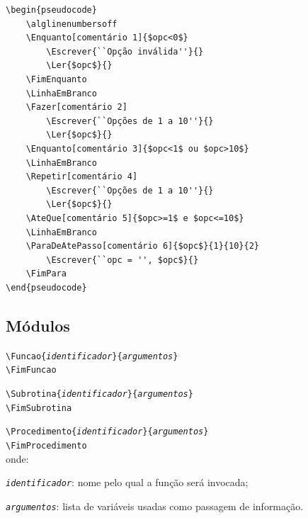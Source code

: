 \documentclass[a4paper,12pt,oneside,onecolumn,final,fleqn]{repUERJ}
\begin{document}
\begin{verbatim}
\begin{pseudocode}
    \alglinenumbersoff
    \Enquanto[comentário 1]{$opc<0$}
        \Escrever{``Opção inválida''}{}
        \Ler{$opc$}{}
    \FimEnquanto
    \LinhaEmBranco
    \Fazer[comentário 2]
        \Escrever{``Opções de 1 a 10''}{}
        \Ler{$opc$}{}
    \Enquanto[comentário 3]{$opc<1$ ou $opc>10$}
    \LinhaEmBranco
    \Repetir[comentário 4]
        \Escrever{``Opções de 1 a 10''}{}
        \Ler{$opc$}{}
    \AteQue[comentário 5]{$opc>=1$ e $opc<=10$}
    \LinhaEmBranco
    \ParaDeAtePasso[comentário 6]{$opc$}{1}{10}{2}
        \Escrever{``opc = '', $opc$}{}
    \FimPara
\end{pseudocode}
\end{verbatim}

\noindent{}

\subsection{Módulos}

\begin{alinea}
  \item \texttt{\textbackslash Funcao\{\textit{identificador}\}\{\textit{argumentos}\}}\\
        \texttt{\textbackslash FimFuncao}
  \item \texttt{\textbackslash Subrotina\{\textit{identificador}\}\{\textit{argumentos}\}}\\
        \texttt{\textbackslash FimSubrotina}
  \item \texttt{\textbackslash Procedimento\{\textit{identificador}\}\{\textit{argumentos}\}}\\
        \texttt{\textbackslash FimProcedimento}\\
        onde:
        \begin{alinea}
            \item \textit{\texttt{identificador}}: nome pelo qual 
                  a função será invocada;
            \item \textit{\texttt{argumentos}}: lista de variáveis
                  usadas como passagem de informação.\\
        \end{alinea}
\end{alinea}
\end{document}
